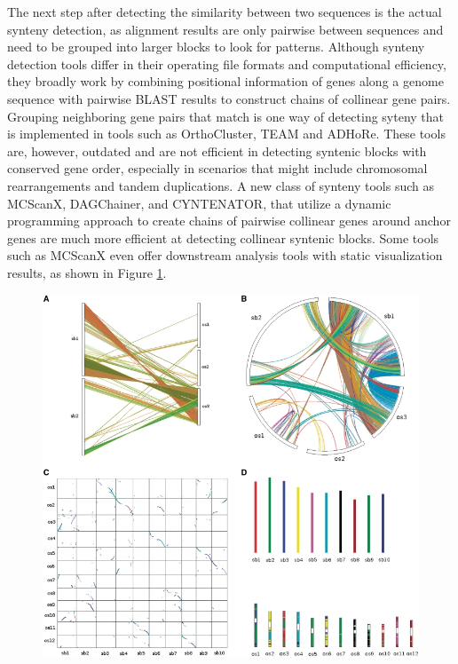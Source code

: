 The next step after detecting the similarity between two sequences is the actual synteny detection, as alignment results are only pairwise between sequences and need to be grouped into larger blocks to look for patterns. Although synteny detection tools differ in their operating file formats and computational efficiency, they broadly work by combining positional information of genes along a genome sequence with pairwise BLAST results to construct chains of collinear gene pairs. Grouping neighboring gene pairs that match is one way of detecting syteny\cite{wang2012mcscanx} that is implemented in tools such as OrthoCluster\cite{zeng2008orthocluster}, TEAM\cite{luc2003gene} and ADHoRe\cite{proost2011adhore}. These tools are, however, outdated and are not efficient in detecting syntenic blocks with conserved gene order, especially in scenarios that might include chromosomal rearrangements and tandem duplications\cite{wang2012mcscanx}. A new class of synteny tools such as MCScanX\cite{wang2012mcscanx}, DAGChainer\cite{haas2004dagchainer}, and CYNTENATOR\cite{rodelsperger2010cyntenator}, that utilize a dynamic programming approach to create chains of pairwise collinear genes around anchor genes are much more efficient at detecting collinear syntenic blocks. Some tools such as MCScanX even offer downstream analysis tools with static visualization results, as shown in Figure \ref{fig:ch_2_synteny_plots}.     

\begin{figure}
  \centering
  \includegraphics[width=.75\linewidth]{images/ch_2_synteny_plots.jpg}
  \label{fig:ch_2_synteny_plots}
\end{figure}

